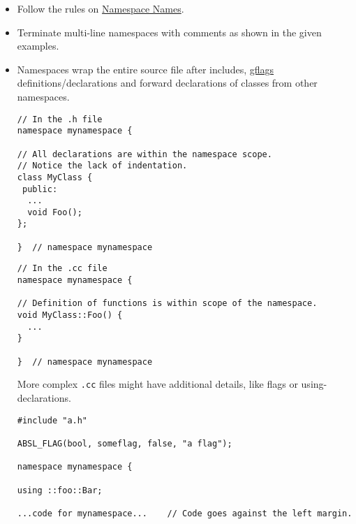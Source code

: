 \begin{itemize}
    \item Follow the rules on \hyperref[subsec:namespace-names]{Namespace Names}.
    \item Terminate multi-line namespaces with comments as shown in the given examples.
    \item Namespaces wrap the entire source file after includes, \href{https://gflags.github.io/gflags/}{gflags} definitions/declarations and forward declarations of classes from other namespaces.
    \begin{verbatim}
// In the .h file
namespace mynamespace {

// All declarations are within the namespace scope.
// Notice the lack of indentation.
class MyClass {
 public:
  ...
  void Foo();
};

}  // namespace mynamespace
    \end{verbatim}
    \begin{verbatim}
// In the .cc file
namespace mynamespace {

// Definition of functions is within scope of the namespace.
void MyClass::Foo() {
  ...
}

}  // namespace mynamespace
    \end{verbatim}
    More complex \texttt{.cc} files might have additional details, like flags or using-declarations.
    \begin{verbatim}
#include "a.h"

ABSL_FLAG(bool, someflag, false, "a flag");

namespace mynamespace {

using ::foo::Bar;

...code for mynamespace...    // Code goes against the left margin.


\end{verbatim}
\end{itemize}
